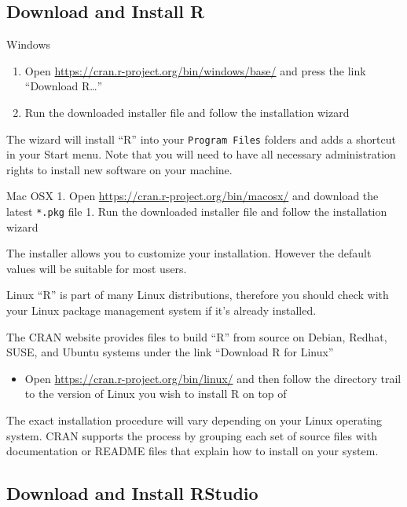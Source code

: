 \documentclass[
  a4paperpaper,
]{book}
\providecommand{\tightlist}{%
  \setlength{\itemsep}{0pt}\setlength{\parskip}{0pt}}
\begin{document}
\newpage

\hypertarget{download-and-install-r}{%
\subsection{Download and Install R}\label{download-and-install-r}}

Windows

\begin{enumerate}
\def\labelenumi{\arabic{enumi}.}
\tightlist
\item
  Open \url{https://cran.r-project.org/bin/windows/base/} and press the link ``Download R\ldots{}''
\item
  Run the downloaded installer file and follow the installation wizard
\end{enumerate}

The wizard will install ``R'' into your \texttt{Program\ Files} folders and adds a shortcut in your Start menu. Note that you will need to have all necessary administration rights to install new software on your machine.

Mac OSX
1. Open \url{https://cran.r-project.org/bin/macosx/} and download the latest \texttt{*.pkg} file
1. Run the downloaded installer file and follow the installation wizard

The installer allows you to customize your installation. However the default values will be suitable for most users.

Linux
``R'' is part of many Linux distributions, therefore you should check with your Linux package management system if it's already installed.

The CRAN website provides files to build ``R'' from source on Debian, Redhat, SUSE, and Ubuntu systems under the link ``Download R for Linux''

\begin{itemize}
\tightlist
\item
  Open \url{https://cran.r-project.org/bin/linux/} and then follow the directory trail to the version of Linux you wish to install R on top of
\end{itemize}

The exact installation procedure will vary depending on your Linux operating system. CRAN supports the process by grouping each set of source files with documentation or README files that explain how to install on your system.

\hypertarget{download-and-install-rstudio}{%
\subsection{Download and Install RStudio}\label{download-and-install-rstudio}}
\end{document}
